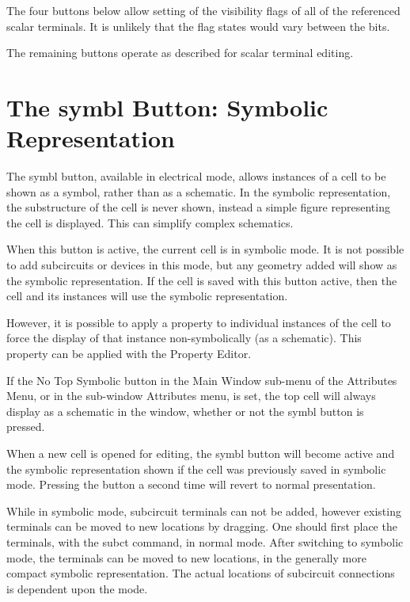 The four buttons below allow setting of the visibility flags of all of
the referenced scalar terminals.  It is unlikely that the flag states
would vary between the bits.

The remaining buttons operate as described for scalar terminal editing.


\section{The {\cb symbl} Button: Symbolic Representation}
\label{symbolic}

The {\cb symbl} button, available in electrical mode, allows instances
of a cell to be shown as a symbol, rather than as a schematic.  In the
symbolic representation, the substructure of the cell is never shown,
instead a simple figure representing the cell is displayed.  This can
simplify complex schematics.

When this button is active, the current cell is in symbolic mode.  It
is not possible to add subcircuits or devices in this mode, but any
geometry added will show as the symbolic representation.  If the cell
is saved with this button active, then the cell and its instances will
use the symbolic representation.

However, it is possible to apply a property to individual instances
of the cell to force the display of that instance non-symbolically
(as a schematic).  This property can be applied with the {\cb
Property Editor}.

If the {\cb No Top Symbolic} button in the {\cb Main Window} sub-menu
of the {\cb Attributes Menu}, or in the sub-window {\cb Attributes}
menu, is set, the top cell will always display as a schematic in the
window, whether or not the {\cb symbl} button is pressed.

When a new cell is opened for editing, the {\cb symbl} button will become
active and the symbolic representation shown if the cell was
previously saved in symbolic mode.  Pressing the button a second time
will revert to normal presentation.

While in symbolic mode, subcircuit terminals can not be added, however
existing terminals can be moved to new locations by dragging.  One
should first place the terminals, with the {\cb subct} command, in
normal mode.  After switching to symbolic mode, the terminals can be
moved to new locations, in the generally more compact symbolic
representation.  The actual locations of subcircuit connections is
dependent upon the mode.


